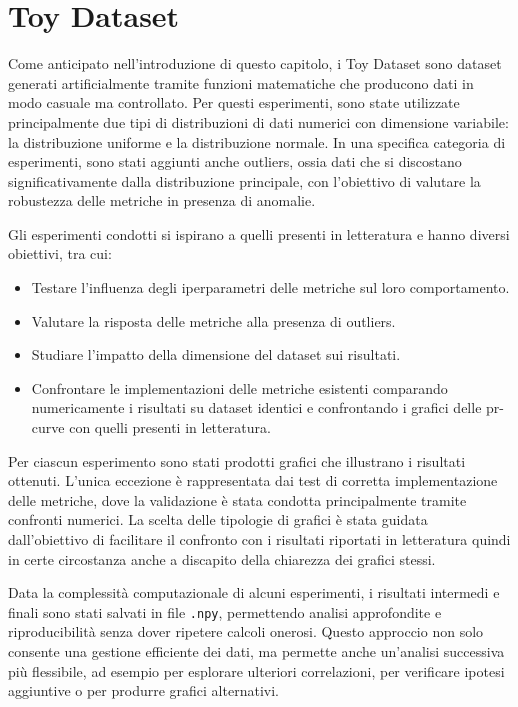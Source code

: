 \section{Toy Dataset}
\label{sec:toy-dataset}

Come anticipato nell’introduzione di questo capitolo, i Toy Dataset sono dataset generati artificialmente tramite funzioni matematiche che producono dati in modo casuale ma controllato. Per questi esperimenti, sono state utilizzate principalmente due tipi di distribuzioni di dati numerici con dimensione variabile: la distribuzione uniforme e la distribuzione normale. In una specifica categoria di esperimenti, sono stati aggiunti anche outliers, ossia dati che si discostano significativamente dalla distribuzione principale, con l'obiettivo di valutare la robustezza delle metriche in presenza di anomalie.

Gli esperimenti condotti si ispirano a quelli presenti in letteratura e hanno diversi obiettivi, tra cui:
\begin{itemize}
    \item Testare l'influenza degli iperparametri delle metriche sul loro comportamento.
    \item Valutare la risposta delle metriche alla presenza di outliers.
    \item Studiare l'impatto della dimensione del dataset sui risultati.
    \item Confrontare le implementazioni delle metriche esistenti comparando numericamente i risultati su dataset identici e confrontando i grafici delle pr-curve con quelli presenti in letteratura.
\end{itemize}

Per ciascun esperimento sono stati prodotti grafici che illustrano i risultati ottenuti. L'unica eccezione è rappresentata dai test di corretta implementazione delle metriche, dove la validazione è stata condotta principalmente tramite confronti numerici. La scelta delle tipologie di grafici è stata guidata dall'obiettivo di facilitare il confronto con i risultati riportati in letteratura quindi in certe circostanza anche a discapito della chiarezza dei grafici stessi.

Data la complessità computazionale di alcuni esperimenti, i risultati intermedi e finali sono stati salvati in file \texttt{.npy}, permettendo analisi approfondite e riproducibilità senza dover ripetere calcoli onerosi. Questo approccio non solo consente una gestione efficiente dei dati, ma permette anche un'analisi successiva più flessibile, ad esempio per esplorare ulteriori correlazioni, per verificare ipotesi aggiuntive o per produrre grafici alternativi.

